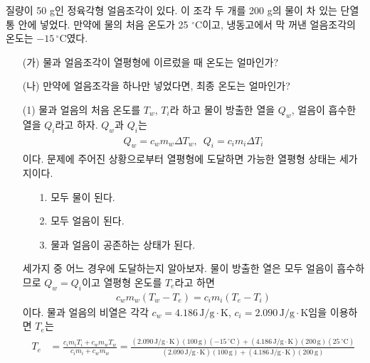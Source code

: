 \documentclass[floatfix,nofootinbib,superscriptaddress,fleqn]{revtex4-2}
\begin{document}
질량이 50 g인 정육각형 얼음조각이 있다. 이 조각 두 개를 200 g의 물이
차 있는 단열통 안에 넣었다. 만약에 물의 처음 온도가 25
${}^\circ\mathrm{C}$이고, 냉동고에서 막 꺼낸 얼음조각의 온도는 $-15\,
{}^\circ\mathrm{C}$였다. 
\begin{itemize}
\item[(가)] 물과 얼음조각이 열평형에 이르렀을 때 온도는 얼마인가?
\item[(나)] 만약에 얼음조각을 하나만 넣었다면, 최종 온도는 얼마인가? 
\end{itemize}
\vspace{1.cm}
\begin{itemize}
  \item[(1)]
  물과 얼음의 처음 온도를 $T_w$, $T_i$라 하고
물이 방출한 열을 $Q_{w}$, 얼음이 흡수한 열을 $Q_{i}$라고 하자.
$Q_{w}$과 $Q_{i}$는
\begin{align}
  \begin{split}
    Q_{w}  = c_{w}m_{w}\Delta T_w ,\,\,\,Q_{i} = c_{i}m_{i}\Delta T_i
  \end{split}
\end{align}
이다. 문제에 주어진 상황으로부터 열평형에 도달하면 가능한 열평형 상태는 세가지이다.
\begin{itemize}
  \item[1.] 모두 물이 된다.
  \item[2.] 모두 얼음이 된다.
  \item[3.] 물과 얼음이 공존하는 상태가 된다.  
\end{itemize}
세가지 중 어느 경우에 도달하는지 알아보자. 물이 방출한 열은 모두 얼음이 흡수하므로
$Q_{w}  =  Q_{i}$이고 열평형 온도를 $T_e$라고 하면
\begin{align}\label{eq:3-2}
  c_{w}m_{w}(T_w-T_e) = c_{i}m_{i}(T_e-T_i)
\end{align}
이다. 물과 얼음의 비열은 각각 $c_{w}=4.186\,\mathrm{J/g\cdot K}$,
$c_{i}=2.090\,\mathrm{J/g\cdot K}$임을 이용하면 $T_e$는
\begin{align}
  \begin{split}
    T_e &= \frac{c_i m_i T_i+c_w m_w T_w}{c_i m_i+c_w m_w}
    = \frac{(2.090\,\mathrm{J/g\cdot K}) (100\,\mathrm{g}) (-15\,\mathrm{^\circ C})
    +(4.186\,\mathrm{J/g\cdot K}) (200\,\mathrm{g}) (25\,\mathrm{^\circ C})}
    {(2.090\,\mathrm{J/g\cdot K}) (100\,\mathrm{g})
    +(4.186\,\mathrm{J/g\cdot K}) (200\,\mathrm{g})}  \\

\end{split}
\end{align}
\end{itemize}
\end{document}
